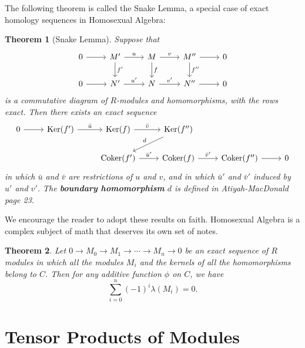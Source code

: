 \documentclass[11pt]{article}
\newtheorem{theorem}{Theorem}
\newcommand{\Ker}{\operatorname{Ker}}
\newcommand{\Coker}{\operatorname{Coker}}
\begin{document}
The following theorem is called the Snake Lemma, a special case of exact homology sequences in Homosexual Algebra: 

\begin{adjustwidth}{0.5cm}{}
  \begin{theorem}[Snake Lemma]
    Suppose that
    \[ \begin{tikzcd}
      0 \arrow[r] & M' \arrow[r, "u"] \arrow[d, "f'"] & M \arrow[r, "v"] \arrow[d, "f"] & M'' \arrow[r] \arrow[d, "f''"] & 0 \\
      0 \arrow[r] & N' \arrow[r, "u'"]                & N \arrow[r, "v'"]               & N'' \arrow[r]                  & 0
    \end{tikzcd} \]
    is a commutative diagram of $R$-modules and homomorphisms, with the rows exact. Then there exists an exact sequence
    \[ \begin{tikzcd}
      0 \arrow[r] & \Ker(f') \arrow[r, "\bar{u}"] & \Ker(f) \arrow[r, "\bar{v}"]     & \Ker(f'') \arrow[ld, "d"']      &                       &   \\
                  &                               & \Coker(f') \arrow[r, "\bar{u}'"] & \Coker(f) \arrow[r, "\bar{v}'"] & \Coker(f'') \arrow[r] & 0
    \end{tikzcd} \]
    in which $\bar{u}$ and $\bar{v}$ are restrictions of $u$ and $v$, and in which $\bar{u}'$ and $\bar{v}'$ induced by $u'$ and $v'$. The \textbf{boundary homomorphism} $d$ is defined in Atiyah-MacDonald page 23.
  \end{theorem}
\end{adjustwidth}

We encourage the reader to adopt these results on faith. Homosexual Algebra is a complex subject of math that deserves its own set of notes.

\begin{adjustwidth}{0.5cm}{}
  \begin{theorem}
    Let $0 \to M_{0} \to M_{1} \to \cdots \to M_{n} \to 0$ be an exact sequence of $R$ modules in which all the modules $M_{i}$ and the kernels of all the homomorphisms belong to $C$. Then for any additive function $\phi$ on $C$, we have
    \[
      \sum\limits_{i = 0}^{n} (-1)^{i} \lambda(M_{i}) = 0.
    \]
  \end{theorem}
\end{adjustwidth}


\section{Tensor Products of Modules}
\end{document}
